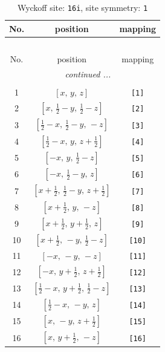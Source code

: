 \documentclass[fleqn,8pt]{jsarticle}
\begin{document}
\begin{longtable}{ccc}
\caption{Wyckoff site: {\tt 16i}, site symmetry: {\tt 1}}
 \\
 \hline \hline
No. & position & mapping \\ \hline \endfirsthead

\multicolumn{2}{l}{\tablename\ \thetable{}} \\
 \hline \hline
No. & position & mapping \\ \hline \endhead

 \hline \hline
\multicolumn{2}{r}{\footnotesize\it continued ...} \\ \endfoot

 \hline \hline
\multicolumn{2}{r}{} \\ \endlastfoot

1 & $\left[ x,\, y,\, z \right]$ & {\tt [1]} \\ \hline
2 & $\left[ x,\, \frac{1}{2} - y,\, \frac{1}{2} - z \right]$ & {\tt [2]} \\ \hline
3 & $\left[ \frac{1}{2} - x,\, \frac{1}{2} - y,\, - z \right]$ & {\tt [3]} \\ \hline
4 & $\left[ \frac{1}{2} - x,\, y,\, z + \frac{1}{2} \right]$ & {\tt [4]} \\ \hline
5 & $\left[ - x,\, y,\, \frac{1}{2} - z \right]$ & {\tt [5]} \\ \hline
6 & $\left[ - x,\, \frac{1}{2} - y,\, z \right]$ & {\tt [6]} \\ \hline
7 & $\left[ x + \frac{1}{2},\, \frac{1}{2} - y,\, z + \frac{1}{2} \right]$ & {\tt [7]} \\ \hline
8 & $\left[ x + \frac{1}{2},\, y,\, - z \right]$ & {\tt [8]} \\ \hline
9 & $\left[ x + \frac{1}{2},\, y + \frac{1}{2},\, z \right]$ & {\tt [9]} \\ \hline
10 & $\left[ x + \frac{1}{2},\, - y,\, \frac{1}{2} - z \right]$ & {\tt [10]} \\ \hline
11 & $\left[ - x,\, - y,\, - z \right]$ & {\tt [11]} \\ \hline
12 & $\left[ - x,\, y + \frac{1}{2},\, z + \frac{1}{2} \right]$ & {\tt [12]} \\ \hline
13 & $\left[ \frac{1}{2} - x,\, y + \frac{1}{2},\, \frac{1}{2} - z \right]$ & {\tt [13]} \\ \hline
14 & $\left[ \frac{1}{2} - x,\, - y,\, z \right]$ & {\tt [14]} \\ \hline
15 & $\left[ x,\, - y,\, z + \frac{1}{2} \right]$ & {\tt [15]} \\ \hline
16 & $\left[ x,\, y + \frac{1}{2},\, - z \right]$ & {\tt [16]} \\
\end{longtable}
\end{document}
